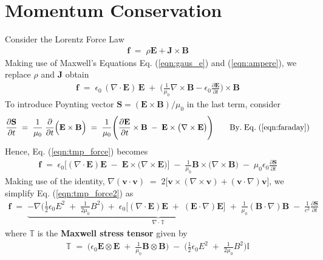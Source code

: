 \documentclass[12pt,a4paper]{article}
\begin{document}
\clearpage

\section{Momentum Conservation}
Consider the Lorentz Force Law
\begin{align}
	\mathbf{f} \; = \; \rho \mathbf{E} + \mathbf{J} \times \mathbf{B}
\end{align}
Making use of Maxwell's Equations Eq. (\ref{eqn:gaus_e}) and (\ref{eqn:ampere}), we replace $\rho$ and $\mathbf{J}$ obtain
\begin{align}
	\mathbf{f} \; = \; \epsilon_{0} \, ( \nabla \cdot \mathbf{E} ) \, \mathbf{E} 
	\; + \; \Big( \frac{1}{\mu_{0}} \nabla \times \mathbf{B} - \epsilon_{0} \frac{\partial \mathbf{E}}{\partial t} \Big) \times \mathbf{B} \label{eqn:tmp_force}
\end{align}
To introduce Poynting vector $\mathbf{S} = (\mathbf{E} \times \mathbf{B})/\mu_{0}$ in the last term, consider
\begin{align}
		\frac{\partial \mathbf{S}}{\partial t} 
		\; = \; 
		\frac{1}{\mu_{0}} \; \frac{\partial}{\partial t} \Big( \mathbf{E} \times \mathbf{B} \Big)
		\; = \; 
		\frac{1}{\mu_{0}} \Bigg( \frac{\partial \mathbf{E}}{\partial t} \times \mathbf{B}
		\; - \; 
		\mathbf{E} \times \big( \nabla \times \mathbf{E} \big) \Bigg) \qquad \mathrm{By. \; Eq.} \; (\ref{eqn:faraday})
\end{align}
Hence, Eq. (\ref{eqn:tmp_force}) becomes
\begin{align}
	\mathbf{f} \; = \; \epsilon_{0} \Big[ ( \nabla \cdot \mathbf{E} ) \mathbf{E}
	\; - \; \mathbf{E} \times \big(\nabla \times \mathbf{E} \big) \Big]
	\; - \;  \frac{1}{\mu_{0}} \mathbf{B}  \times  \big( \nabla \times \mathbf{B} \big)
	\; - \;	 \mu_{0} \epsilon_{0} \frac{\partial \mathbf{S}}{\partial t} \label{eqn:tmp_force2}
\end{align}
Making use of the identity, $\nabla (\mathbf{v} \cdot \mathbf{v}) \; = \; 2 \big[ \mathbf{v} \times (\nabla \times \mathbf{v}) + (\mathbf{v} \cdot \nabla) \mathbf{v} ]$, we simplify Eq.  (\ref{eqn:tmp_force2}) as
\begin{align}
	\mathbf{f} \; = \; \underbrace{
		-\nabla \Bigg( \frac{1}{2} \epsilon_{0} E^{2} \; + \; \frac{1}{2\mu_{0}} B^{2} \Bigg)
		\; + \; 
		\epsilon_{0} \Big[ (\nabla \cdot \mathbf{E}) \mathbf{E} \; + \; (\mathbf{E} \cdot \nabla) \mathbf{E} \Big]
		\; + \; \frac{1}{\mu_{0}} (\mathbf{B} \cdot \nabla) \mathbf{B} 
	}_{\nabla \cdot \mathbb{T}}
	\; - \;  \frac{1}{c^{2}}\frac{\partial \mathbf{S}}{\partial t} \label{eqn:tmp_force3}
\end{align}
where $\mathbb{T}$ is the \textbf{Maxwell stress tensor} given by
\begin{align}
	\mathbb{T} \; = \;  \Bigg( \epsilon_{0} \mathbf{E} \otimes \mathbf{E} \; + \; \frac{1}{\mu_{0}} \mathbf{B} \otimes \mathbf{B} \Bigg) 
	\; - \; 
	\Bigg( \frac{1}{2} \epsilon_{0} E^{2}  \; + \; 
	\frac{1}{2 \mu_{0}} B^{2} \Bigg) \mathbb{I}
\end{align}
\end{document}
